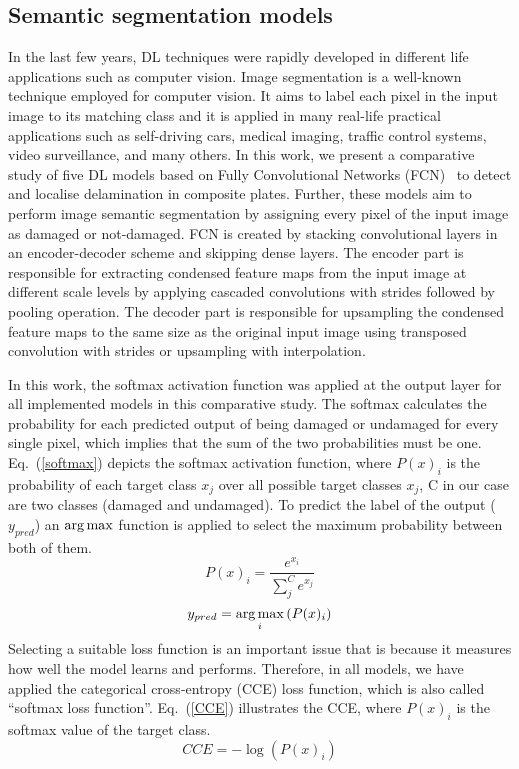 \subsection{Semantic segmentation models}
\label{section:semantic_segmentation}
In the last few years, DL techniques were rapidly developed in different life applications such as computer vision.  
Image segmentation is a well-known technique employed for computer vision. 
It aims to label each pixel in the input image to its matching class and it is applied in many real-life practical applications such as self-driving cars, medical imaging, traffic control systems, video surveillance, and many others.
In this work, we present a comparative study of five DL models based on Fully Convolutional Networks (FCN)~\cite{Long} to detect and localise delamination in composite plates.
Further, these models aim to perform image semantic segmentation by assigning every pixel of the input image as damaged or not-damaged. 
FCN is created by stacking convolutional layers in an encoder-decoder scheme and skipping dense layers. 
The encoder part is responsible for extracting condensed feature maps from the input image at different scale levels by applying cascaded convolutions with strides followed by pooling operation.
The decoder part is responsible for upsampling the condensed feature maps to the same size as the original input image using transposed convolution with strides or upsampling with interpolation.

In this work, the softmax activation function was applied at the output layer for all implemented models in this comparative study.
The softmax calculates the probability for each predicted output of being damaged or undamaged for every single pixel, which implies that the sum of the two probabilities must be one. 
Eq.~(\ref{softmax}) depicts the softmax activation function, where \(P(x)_{i}\) is the probability of each target class \(x_{j}\) over all possible target classes \(x_{j}\), C in our case are two classes  (damaged and undamaged).
To predict the label of the output (\(y_{pred}\)) an \(\operatorname*{arg\,max}\) function is applied to select the maximum probability between both of them.
	\begin{equation}
		P(x)_{i} = \frac{e^{x_{i}}}{\sum_{j}^{C} e^{x_{j}}}
		\label{softmax}
	\end{equation} 
	\begin{equation}
		y_{pred} = \operatorname*{arg\,max}_{i}\left( P(x)_{i} \right)
		\label{argmax}
	\end{equation}
Selecting a suitable loss function is an important issue that is because it measures how well the model learns and performs.
Therefore, in all models, we have applied the categorical cross-entropy (CCE) loss function, which is also called \enquote{softmax loss function}.
Eq.~(\ref{CCE}) illustrates the CCE, where \( P(x)_{i}\) is the softmax value of the target class. 
	\begin{equation}
	CCE = -\log\left( P(x)_{i} \right)
	\label{CCE}
	\end{equation}

